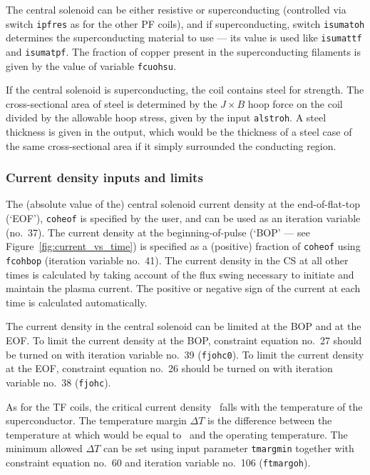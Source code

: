 \documentclass[11pt,a4paper]{report}
\begin{document}
The central solenoid can be either resistive or superconducting (controlled
via switch \texttt{ipfres} as for the other PF coils), and if superconducting,
switch \texttt{isumatoh} determines the superconducting material to use ---
its value is used like \texttt{isumattf} and \texttt{isumatpf}. The fraction
of copper present in the superconducting filaments is given by the value of
variable \texttt{fcuohsu}.

If the central solenoid is superconducting, the coil contains steel for
strength. The cross-sectional area of steel is determined by the $J \times B$
hoop force on the coil divided by the allowable hoop stress, given by the input \texttt{alstroh}. A steel
thickness is given in the output, which would be the thickness of a
steel case of the same cross-sectional area if it simply surrounded the
conducting region.

\subsubsection{Current density inputs and limits}

The (absolute value of the) central solenoid current density at the
end-of-flat-top (`EOF'), \texttt{coheof} is specified by the user, and can be
used as an iteration variable (no.\ 37). The current density at the
beginning-of-pulse (`BOP' --- see Figure~\ref{fig:current_vs_time}) is
specified as a (positive) fraction of \texttt{coheof} using \texttt{fcohbop}
(iteration variable no.\ 41). The current density in the CS at all other times
is calculated by taking account of the flux swing necessary to initiate and
maintain the plasma current. The positive or negative sign of the current at
each time is calculated automatically.

The current density in the central solenoid can be limited at the BOP and at
the EOF. To limit the current density at the BOP, constraint equation no.\ 27
should be turned on with iteration variable no.\ 39 (\texttt{fjohc0}). To
limit the current density at the EOF, constraint equation no.\ 26 should be
turned on with iteration variable no.\ 38 (\texttt{fjohc}).

As for the TF coils, the critical current density \jcrit\ falls with the
temperature of the superconductor. The temperature margin $\Delta T$ is the
difference between the temperature at which \jcrit would be equal to \jop\ and
the operating temperature. The minimum allowed $\Delta T$ can be set using
input parameter \texttt{tmargmin} together with constraint equation no.\ 60
and iteration variable no.\ 106 (\texttt{ftmargoh}).
\end{document}
